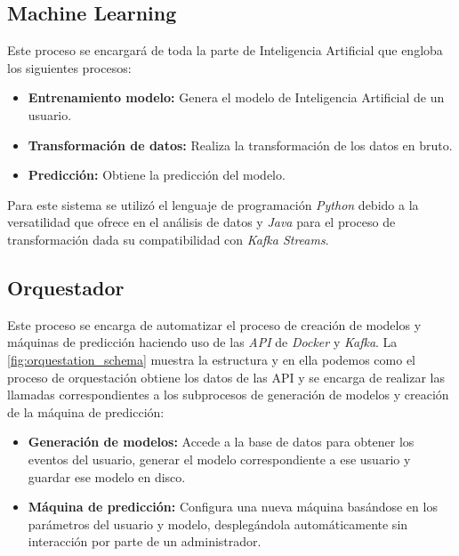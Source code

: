 \subsection{Machine Learning}

Este proceso se encargará de toda la parte de Inteligencia Artificial que engloba los siguientes procesos:

\begin{itemize}[noitemsep]
    \item \textbf{Entrenamiento modelo:} Genera el modelo de Inteligencia Artificial de un usuario.
    \item \textbf{Transformación de datos:} Realiza la transformación de los datos en bruto.
    \item \textbf{Predicción:} Obtiene la predicción del modelo.
\end{itemize}


Para este sistema se utilizó el lenguaje de programación \textit{Python} debido a la versatilidad que ofrece en el análisis de datos y \textit{Java} para el proceso de transformación dada su compatibilidad con \textit{Kafka Streams}.

\subsection{Orquestador}

Este proceso se encarga de automatizar el proceso de creación de modelos y máquinas de predicción  haciendo uso de las \textit{API} de \textit{Docker} y \textit{Kafka}.
La \cref{fig:orquestation_schema} muestra la estructura y en ella podemos como el proceso de orquestación  obtiene los datos de las API y se encarga de realizar las llamadas correspondientes a los subprocesos de generación de modelos y creación de la máquina de predicción:

\begin{itemize}[noitemsep]
    \item \textbf{Generación de modelos:} Accede a la base de datos para obtener los eventos del usuario, generar el modelo correspondiente a ese usuario y guardar ese modelo en disco.
    \item \textbf{Máquina de predicción:} Configura una nueva máquina basándose en los parámetros del usuario y modelo, desplegándola automáticamente sin interacción por parte de un administrador.
\end{itemize}


